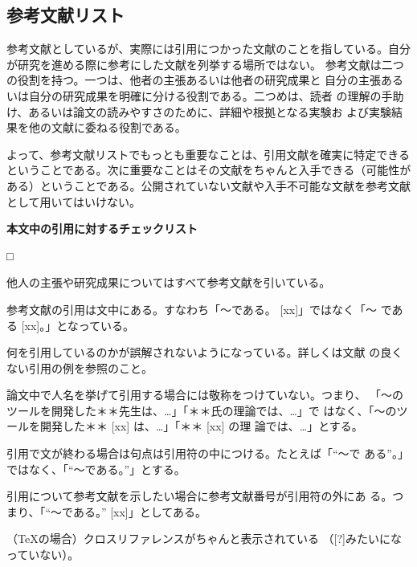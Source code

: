 \documentclass[11pt,a4j]{jsarticle}
\begin{document}
\subsection{参考文献リスト}

参考文献としているが、実際には引用につかった文献のことを指している。自分
が研究を進める際に参考にした文献を列挙する場所ではない。
参考文献は二つの役割を持つ。一つは、他者の主張あるいは他者の研究成果と
自分の主張あるいは自分の研究成果を明確に分ける役割である。二つめは、読者
の理解の手助け、あるいは論文の読みやすさのために、詳細や根拠となる実験お
よび実験結果を他の文献に委ねる役割である。

よって、参考文献リストでもっとも重要なことは、引用文献を確実に特定できる
ということである。次に重要なことはその文献をちゃんと入手できる（可能性が
ある）ということである。公開されていない文献や入手不可能な文献を参考文献
として用いてはいけない。

\begin{flushleft}
 {\bf 本文中の引用に対するチェックリスト}
\end{flushleft}
\begin{list}%
 {□} %
 {} %
 \item 他人の主張や研究成果についてはすべて参考文献を引いている。
 \item 参考文献の引用は文中にある。すなわち「〜である。 [xx]」ではなく「〜
       である [xx]。」となっている。
 \item 何を引用しているのかが誤解されないようになっている。詳しくは文献
       \cite{Sakai_HowToWrite_02}の良くない引用の例を参照のこと。
 \item 論文中で人名を挙げて引用する場合には敬称をつけていない。つまり、
       「〜のツールを開発した＊＊先生は、…」「＊＊氏の理論では、…」で
       はなく、「〜のツールを開発した＊＊ [xx] は、…」「＊＊ [xx] の理
       論では、…」とする。
 \item 引用で文が終わる場合は句点は引用符の中につける。たとえば「``〜で
       ある''。」ではなく、「``〜である。''」とする。
 \item 引用について参考文献を示したい場合に参考文献番号が引用符の外にあ
       る。つまり、「``〜である。'' [xx]」としてある。
 \item （TeXの場合）クロスリファレンスがちゃんと表示されている
       （[?]みたいになっていない）。

\end{list}
\end{document}
